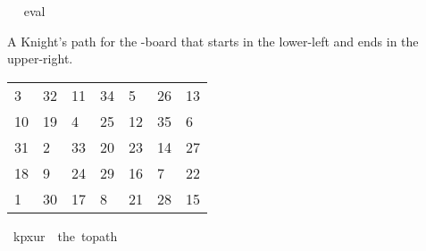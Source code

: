 \begin{isabellebody}
\isadelimproof
\ %
\endisadelimproof
%
\isatagproof
{}\isamarkupfalse%
\ eval%
\endisatagproof
{\isafoldproof}%
%
\isadelimproof
%
\endisadelimproof
%
\begin{isamarkuptext}%
A Knight's path for the -board that starts in the lower-left and ends in the 
upper-right.
  \begin{table}[H]
    \begin{tabular}{lllllll}
       3 & 32 & 11 & 34 &  5 & 26 & 13 \\
      10 & 19 &  4 & 25 & 12 & 35 &  6 \\
      31 &  2 & 33 & 20 & 23 & 14 & 27 \\
      18 &  9 & 24 & 29 & 16 &  7 & 22 \\
       1 & 30 & 17 &  8 & 21 & 28 & 15
    \end{tabular}
  \end{table}%
\end{isamarkuptext}\isamarkuptrue%
\isamarkupfalse%
\ {\isachardoublequoteopen}kp{}x{}ur\ {\isasymequiv}\ the\ {\isacharparenleft}{\kern0pt}to{\isacharunderscore}{\kern0pt}path\ \isanewline
\ \ {\isacharbrackleft}{\kern0pt}{\isacharbrackleft}{\kern0pt}{}{\isacharcomma}{\kern0pt}{}{}{\isacharcomma}{\kern0pt}{}{}{\isacharcomma}{\kern0pt}{}{}{\isacharcomma}{\kern0pt}{}{\isacharcomma}{\kern0pt}{}{}{\isacharcomma}{\kern0pt}{}{}{\isacharbrackright}{\kern0pt}{\isacharcomma}{\kern0pt}\isanewline
\ \ {\isacharbrackleft}{\kern0pt}{}{}{\isacharcomma}{\kern0pt}{}{}{\isacharcomma}{\kern0pt}{}{\isacharcomma}{\kern0pt}{}{}{\isacharcomma}{\kern0pt}{}{}{\isacharcomma}{\kern0pt}{}{}{\isacharcomma}{\kern0pt}{}{\isacharbrackright}{\kern0pt}{\isacharcomma}{\kern0pt}\isanewline
\ \ {\isacharbrackleft}{\kern0pt}{}{}{\isacharcomma}{\kern0pt}{}{\isacharcomma}{\kern0pt}{}{}{\isacharcomma}{\kern0pt}{}{}{\isacharcomma}{\kern0pt}{}{}{\isacharcomma}{\kern0pt}{}{}{\isacharcomma}{\kern0pt}{}{}{\isacharbrackright}{\kern0pt}{\isacharcomma}{\kern0pt}\isanewline

\end{isabellebody}
